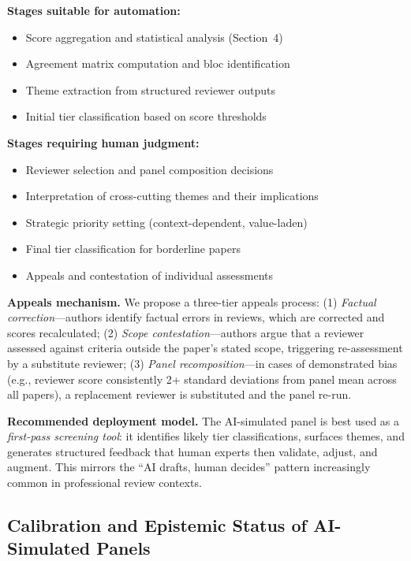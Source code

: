 \textbf{Stages suitable for automation:}
\begin{itemize}
    \item Score aggregation and statistical analysis (Section~4)
    \item Agreement matrix computation and bloc identification
    \item Theme extraction from structured reviewer outputs
    \item Initial tier classification based on score thresholds
\end{itemize}

\textbf{Stages requiring human judgment:}
\begin{itemize}
    \item Reviewer selection and panel composition decisions
    \item Interpretation of cross-cutting themes and their implications
    \item Strategic priority setting (context-dependent, value-laden)
    \item Final tier classification for borderline papers
    \item Appeals and contestation of individual assessments
\end{itemize}

\textbf{Appeals mechanism.} We propose a three-tier appeals process: (1) \textit{Factual correction}---authors identify factual errors in reviews, which are corrected and scores recalculated; (2) \textit{Scope contestation}---authors argue that a reviewer assessed against criteria outside the paper's stated scope, triggering re-assessment by a substitute reviewer; (3) \textit{Panel recomposition}---in cases of demonstrated bias (e.g., reviewer score consistently 2+ standard deviations from panel mean across all papers), a replacement reviewer is substituted and the panel re-run.

\textbf{Recommended deployment model.} The AI-simulated panel is best used as a \textit{first-pass screening tool}: it identifies likely tier classifications, surfaces themes, and generates structured feedback that human experts then validate, adjust, and augment. This mirrors the ``AI drafts, human decides'' pattern increasingly common in professional review contexts.

\subsection{Calibration and Epistemic Status of AI-Simulated Panels}
\label{sec:calibration}


